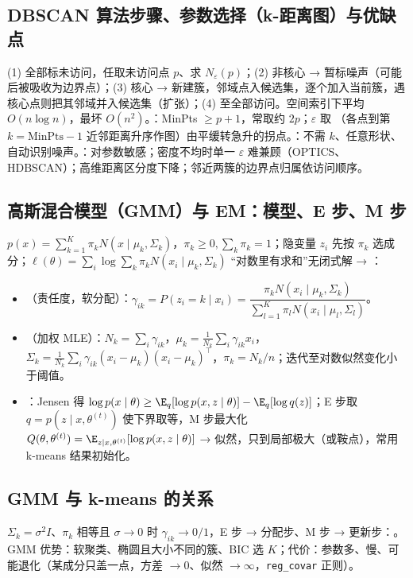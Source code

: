 \subsection{DBSCAN 算法步骤、参数选择（k-距离图）与优缺点}
(1) 全部标未访问，任取未访问点 $p$、求 $N_\varepsilon(p)$；(2) 非核心 → 暂标噪声（可能后被吸收为边界点）；(3) 核心 → 新建簇，邻域点入候选集，逐个加入当前簇，遇核心点则把其邻域并入候选集（扩张）；(4) 至全部访问。空间索引下平均 $O(n\log n)$，最坏 $O(n^2)$。：MinPts $\ge p+1$，常取约 $2p$；$\varepsilon$ 取 （各点到第 $k=\text{MinPts}-1$ 近邻距离升序作图）由平缓转急升的拐点。：不需 $k$、任意形状、自动识别噪声。：对参数敏感；密度不均时单一 $\varepsilon$ 难兼顾（OPTICS、HDBSCAN）；高维距离区分度下降；邻近两簇的边界点归属依访问顺序。

\subsection{高斯混合模型（GMM）与 EM：模型、E 步、M 步}
$p(x)=\sum_{k=1}^K\pi_kN(x\mid\mu_k,\Sigma_k)$，$\pi_k\ge0,\sum_k\pi_k=1$；隐变量 $z_i$ 先按 $\pi_k$ 选成分；$\ell(\theta)=\sum_i\log\sum_k\pi_kN(x_i\mid\mu_k,\Sigma_k)$ “对数里有求和”无闭式解 → ：
\begin{itemize}
\item {}（责任度，软分配）：$\gamma_{ik}=P(z_i=k\mid x_i)=\dfrac{\pi_kN(x_i\mid\mu_k,\Sigma_k)}{\sum_{l=1}^K\pi_lN(x_i\mid\mu_l,\Sigma_l)}$。
\item {}（加权 MLE）：$N_k=\sum_i\gamma_{ik}$，$\mu_k=\frac1{N_k}\sum_i\gamma_{ik}x_i$，$\Sigma_k=\frac1{N_k}\sum_i\gamma_{ik}(x_i-\mu_k)(x_i-\mu_k)^\top$，$\pi_k=N_k/n$；迭代至对数似然变化小于阈值。
\item {}：Jensen 得 $\log p(x\mid\theta)\ge\E_q[\log p(x,z\mid\theta)]-\E_q[\log q(z)]$；E 步取 $q=p(z\mid x,\theta^{(t)})$ 使下界取等，M 步最大化 $Q(\theta,\theta^{(t)})=\E_{z\mid x,\theta^{(t)}}[\log p(x,z\mid\theta)]$ → 似然，只到局部极大（或鞍点），常用 k-means 结果初始化。
\end{itemize}

\subsection{GMM 与 k-means 的关系}
$\Sigma_k=\sigma^2I$、$\pi_k$ 相等且 $\sigma\to0$ 时 $\gamma_{ik}\to0/1$，E 步 → 分配步、M 步 → 更新步：。GMM 优势：软聚类、椭圆且大小不同的簇、BIC 选 $K$；代价：参数多、慢、可能退化（某成分只盖一点，方差 $\to0$、似然 $\to\infty$，\texttt{reg\_covar} 正则）。

